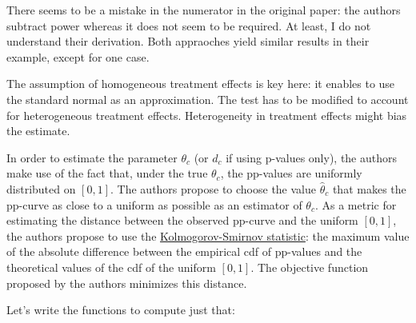 \documentclass[]{book}
\theoremstyle{definition}
\theoremstyle{definition}
\theoremstyle{definition}
\theoremstyle{remark}
\let\BeginKnitrBlock\begin \let\EndKnitrBlock\end
\begin{document}
\BeginKnitrBlock{remark}
\iffalse{} {Remark. } \fi{}There seems to be a mistake in the numerator in the original paper: the authors subtract power whereas it does not seem to be required.
At least, I do not understand their derivation.
Both appraoches yield similar results in their example, except for one case.
\EndKnitrBlock{remark}

\BeginKnitrBlock{remark}
\iffalse{} {Remark. } \fi{}The assumption of homogeneous treatment effects is key here: it enables to use the standard normal as an approximation.
The test has to be modified to account for heterogeneous treatment effects.
Heterogeneity in treatment effects might bias the estimate.
\EndKnitrBlock{remark}

In order to estimate the parameter \(\theta_c\) (or \(d_c\) if using p-values only), the authors make use of the fact that, under the true \(\theta_c\), the pp-values are uniformly distributed on \(\left[0,1\right]\).
The authors propose to choose the value \(\hat{\theta}_c\) that makes the pp-curve as close to a uniform as possible as an estimator of \(\theta_c\).
As a metric for estimating the distance between the observed pp-curve and the uniform \(\left[0,1\right]\), the authors propose to use the \href{https://en.wikipedia.org/wiki/Kolmogorov–Smirnov_test}{Kolmogorov-Smirnov statistic}: the maximum value of the absolute difference between the empirical cdf of pp-values and the theoretical values of the cdf of the uniform \(\left[0,1\right]\).
The objective function proposed by the authors minimizes this distance.

Let's write the functions to compute just that:
\end{document}

